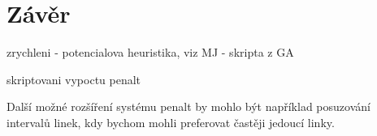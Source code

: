 \chapter*{Závěr}

zrychleni - potencialova heuristika, viz MJ - skripta z GA

skriptovani vypoctu penalt

Další možné rozšíření systému penalt by mohlo být například posuzování intervalů
linek, kdy bychom mohli preferovat častěji jedoucí linky. 

